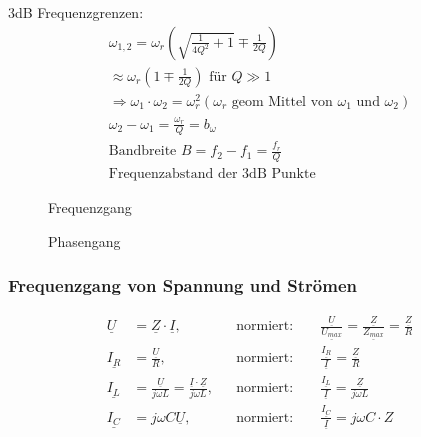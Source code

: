 3dB Frequenzgrenzen:\\
\begin{align}
	\boxed{\omega_{1,2}=\omega_r\left(\sqrt{\frac{1}{4Q^2}+1}\mp\frac{1}{2Q}\right)}\\
	\approx \omega_r\left(1\mp\frac{1}{2Q}\right) \text{ für } Q \gg 1\nonumber\\
	\Rightarrow \omega_1\cdot\omega_2=\omega_r^2 (\omega_r \text{ geom Mittel von
		} \omega_1 \text{ und } \omega_2)\nonumber\\
	\omega_2 - \omega_1 = \frac{\omega_r}{Q} = b_{\omega}\nonumber\\
	\boxed{\text{Bandbreite } B = f_2 - f_1 = \frac{f_r}{Q}}\\
	\text{Frequenzabstand der 3dB Punkte}\nonumber
\end{align}

\begin{figure}[!h]
	\centering
	
	\caption{Frequenzgang}
	\label{fig:ParallelImpedanzBetrag}
\end{figure}
\begin{figure}[!h]
	\centering
	
	\caption{Phasengang}
	\label{fig:ParallelImpedanzPhase}
\end{figure}

\subsubsection{Frequenzgang von Spannung und Strömen}
\begin{align}
	\underline{U} &= \underline{Z} \cdot \underline{I},
	&& \text{normiert: }
	&& \frac{\underline{U}}{\underline{U_{max}}} =
	\frac{\underline{Z}}{\underline{Z_{max}}} = \frac{\underline{Z}}{R}\nonumber\\
	\underline{I_R} &= \frac{\underline{U}}{R},
	&& \text{normiert:}
	&& \frac{\underline{I_R}}{\underline{I}} = \frac{\underline{Z}}{R}\nonumber\\
	\underline{I_L} &= \frac{\underline{U}}{j\omega L} =
	\frac{\underline{I}\cdot\underline{Z}}{j\omega L},
	&& \text{normiert:	}
	&& \frac{\underline{I_L}}{\underline{I}}=\frac{\underline{Z}}{j\omega
	L}\nonumber\\
	\underline{I_C} &= j\omega C \underline{U},
	&& \text{normiert:}
	&& \frac{\underline{I_C}}{\underline{I}} = j\omega C\cdot Z\nonumber
\end{align}\\

